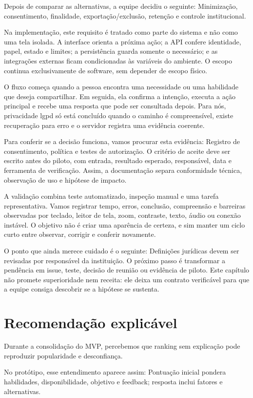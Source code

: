 \documentclass[12pt,oneside,a4paper,article]{abntex2}
\begin{document}
Depois de comparar as alternativas, a equipe decidiu o seguinte: Minimização, consentimento, finalidade, exportação/exclusão, retenção e controle institucional.

Na implementação, este requisito é tratado como parte do sistema e não como uma tela isolada. A interface orienta a próxima ação; a API confere identidade, papel, estado e limites; a persistência guarda somente o necessário; e as integrações externas ficam condicionadas às variáveis do ambiente. O escopo continua exclusivamente de software, sem depender de escopo físico.

O fluxo começa quando a pessoa encontra uma necessidade ou uma habilidade que deseja compartilhar. Em seguida, ela confirma a intenção, executa a ação principal e recebe uma resposta que pode ser consultada depois. Para nós, privacidade lgpd só está concluído quando o caminho é compreensível, existe recuperação para erro e o servidor registra uma evidência coerente.

Para conferir se a decisão funciona, vamos procurar esta evidência: Registro de consentimento, política e testes de autorização. O critério de aceite deve ser escrito antes do piloto, com entrada, resultado esperado, responsável, data e ferramenta de verificação. Assim, a documentação separa conformidade técnica, observação de uso e hipótese de impacto.

A validação combina teste automatizado, inspeção manual e uma tarefa representativa. Vamos registrar tempo, erros, conclusão, compreensão e barreiras observadas por teclado, leitor de tela, zoom, contraste, texto, áudio ou conexão instável. O objetivo não é criar uma aparência de certeza, e sim manter um ciclo curto entre observar, corrigir e conferir novamente.

O ponto que ainda merece cuidado é o seguinte: Definições jurídicas devem ser revisadas por responsável da instituição. O próximo passo é transformar a pendência em issue, teste, decisão de reunião ou evidência de piloto. Este capítulo não promete superioridade nem receita: ele deixa um contrato verificável para que a equipe consiga descobrir se a hipótese se sustenta.

\section{Recomendação explicável}
Durante a consolidação do MVP, percebemos que ranking sem explicação pode reproduzir popularidade e desconfiança.

No protótipo, esse entendimento aparece assim: Pontuação inicial pondera habilidades, disponibilidade, objetivo e feedback; resposta inclui fatores e alternativas.
\end{document}
